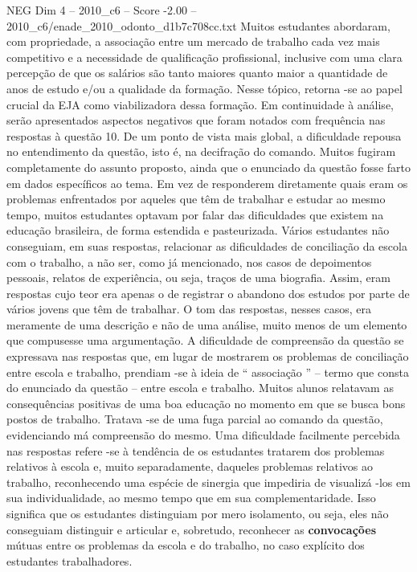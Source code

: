 \begin{textsample}{NEG Dim 4 – 2010\_c6 – Score -2.00 – 2010\_c6/enade\_2010\_odonto\_d1b7c708cc.txt}
Muitos estudantes abordaram, com propriedade, a associação entre um mercado de trabalho cada vez mais competitivo e a necessidade de qualificação profissional, inclusive com uma clara percepção de que os salários são tanto maiores quanto maior a quantidade de anos de estudo e/ou a qualidade da formação.
Nesse tópico, retorna -se ao papel crucial da EJA como viabilizadora dessa formação.
Em continuidade à análise, serão apresentados aspectos negativos que foram notados com frequência nas respostas à questão 10.
De um ponto de vista mais global, a dificuldade repousa no entendimento da questão, isto é, na decifração do comando.
Muitos fugiram completamente do assunto proposto, ainda que o enunciado da questão fosse farto em dados específicos ao tema.
Em vez de responderem diretamente quais eram os problemas enfrentados por aqueles que têm de trabalhar e estudar ao mesmo tempo, muitos estudantes optavam por falar das dificuldades que existem na educação brasileira, de forma estendida e pasteurizada.
Vários estudantes não conseguiam, em suas respostas, relacionar as dificuldades de conciliação da escola com o trabalho, a não ser, como já mencionado, nos casos de depoimentos pessoais, relatos de experiência, ou seja, traços de uma biografia.
Assim, eram respostas cujo teor era apenas o de registrar o abandono dos estudos por parte de vários jovens que têm de trabalhar.
O tom das respostas, nesses casos, era meramente de uma descrição e não de uma análise, muito menos de um elemento que compusesse uma argumentação.
A dificuldade de compreensão da questão se expressava nas respostas que, em lugar de mostrarem os problemas de conciliação entre escola e trabalho, prendiam -se à ideia de “ associação ” – termo que consta do enunciado da questão – entre escola e trabalho.
Muitos alunos relatavam as consequências positivas de uma boa educação no momento em que se busca bons postos de trabalho.
Tratava -se de uma fuga parcial ao comando da questão, evidenciando má compreensão do mesmo.
Uma dificuldade facilmente percebida nas respostas refere -se à tendência de os estudantes tratarem dos problemas relativos à escola e, muito separadamente, daqueles problemas relativos ao trabalho, reconhecendo uma espécie de sinergia que impediria de visualizá -los em sua individualidade, ao mesmo tempo que em sua complementaridade.
Isso significa que os estudantes distinguiam por mero isolamento, ou seja, eles não conseguiam distinguir e articular e, sobretudo, reconhecer as \textbf{convocações} mútuas entre os problemas da escola e do trabalho, no caso explícito dos estudantes trabalhadores.

\end{textsample}
